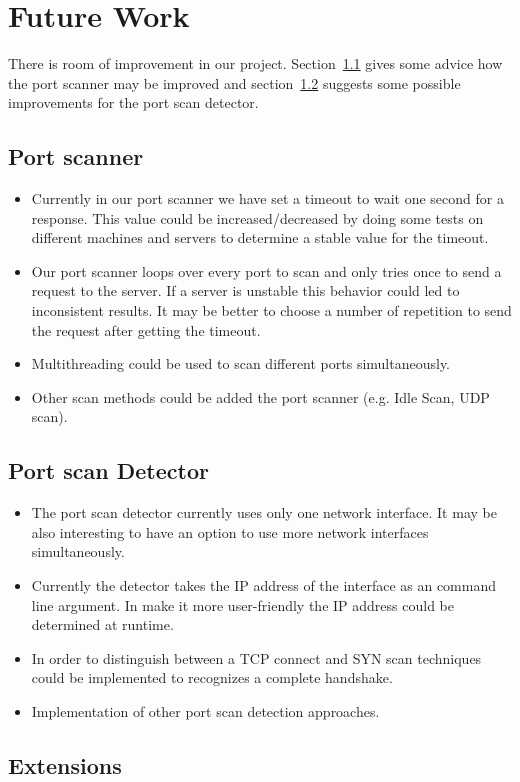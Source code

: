\documentclass[a4paper]{scrreprt}
\begin{document}



\chapter{Future Work}
There is room of improvement in our project. Section~\ref{sec:improve:scan} gives some advice how the port scanner may be improved and section~\ref{sec:improve:detector} suggests some 
possible improvements for the port scan detector. 
\section{Port scanner}
\label{sec:improve:scan}
\begin{itemize}
\item Currently in our port scanner we have set a timeout to wait one second for a response. This value could be increased/decreased by
doing some tests on different machines and servers to determine a stable value for the timeout.
\item Our port scanner loops over every port to scan and only tries once to send a request to the server. If a server is unstable this behavior could
led to inconsistent results. It may be better to choose a number of repetition to send the request after getting the timeout.
\item Multithreading could be used to scan different ports simultaneously. 
\item Other scan methods could be added the port scanner (e.g. Idle Scan, UDP scan).
\end{itemize}
\section{Port scan Detector}
\label{sec:improve:detector}
\begin{itemize}
\item The port scan detector currently uses only one network interface. It may be also interesting to have an option to use more network interfaces simultaneously.
\item Currently the detector takes the IP address of the interface as an command line argument. In make it more user-friendly the IP address could be determined at runtime.
\item In order to distinguish between a TCP connect and SYN scan techniques could be implemented to recognizes a complete handshake.
\item Implementation of other port scan detection approaches.
	

\end{itemize}



\section{Extensions}


\newpage
\end{document}
